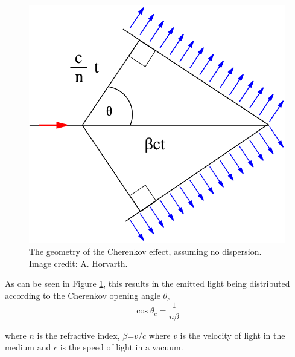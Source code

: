 \begin{figure}[ht] 
        \centering \includegraphics[width=0.5\columnwidth]{figures/Cherenkov.png}

        \caption{
                \label{fig:cherenkov} %
                The geometry of the Cherenkov effect, assuming no dispersion. Image credit: A. Horvarth.
        }
\end{figure}

As can be seen in Figure \ref{fig:cherenkov}, this results in the emitted light being distributed according to the Cherenkov opening angle $\theta_c$
\begin{equation}
    \cos\theta_c=\frac{1}{n\beta}
    \label{eq:cherenkov}
\end{equation}

where $n$ is the refractive index, $\beta$=$v/c$ where $v$ is the velocity of light in the medium and $c$ is the speed of light in a vacuum.

